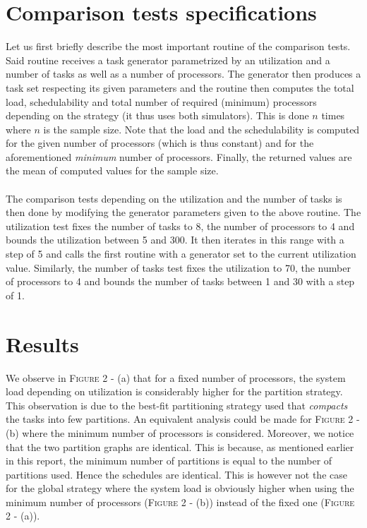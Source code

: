 \documentclass[a4paper]{article}
\begin{document}
\section{Comparison tests specifications}
Let us first briefly describe the most important routine of the comparison tests. Said routine receives a task generator parametrized by an utilization and a number of tasks as well as a number of processors. The generator then produces a task set respecting its given parameters and the routine then computes the total load, schedulability and total number of required (minimum) processors depending on the strategy (it thus uses both simulators). This is done $n$ times where $n$ is the sample size. Note that the load and the schedulability is computed for the given number of processors (which is thus constant) and for the aforementioned \textit{minimum} number of processors. Finally, the returned values are the mean of computed values for the sample size.
\paragraph{}
The comparison tests depending on the utilization and the number of tasks is then done by modifying the generator parameters given to the above routine. 
The utilization test fixes the number of tasks to 8, the number of processors to 4 and bounds the utilization between 5 and 300. It then iterates in this range with a step of 5 and calls the first routine with a generator set to the current utilization value.
Similarly, the number of tasks test fixes the utilization to 70, the number of processors to 4 and bounds the number of tasks between 1 and 30 with a step of 1. 

\section{Results}

We observe in \textsc{Figure 2} - (a) that for a fixed number of processors, the system load depending on utilization is considerably higher for the partition strategy. This observation is due to the best-fit partitioning strategy used that \textit{compacts} the tasks into few partitions. An equivalent analysis could be made for \textsc{Figure 2} - (b) where the minimum number of processors is considered. Moreover, we notice that the two partition graphs are identical. This is because, as mentioned earlier in this report, the minimum number of partitions is equal to the number of partitions used. Hence the schedules are identical. This is however not the case for the global strategy where the system load is obviously higher when using the minimum number of processors (\textsc{Figure 2} - (b)) instead of the fixed one (\textsc{Figure 2} - (a)).
\end{document}
